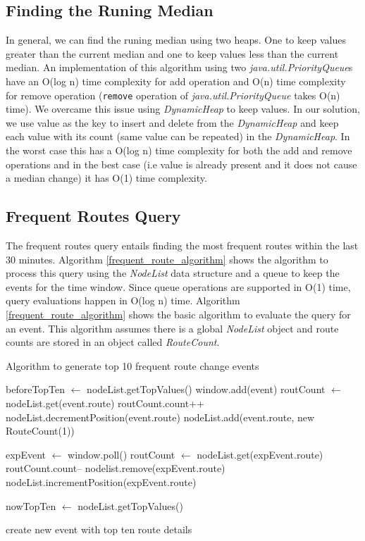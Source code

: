 \subsection{Finding the Runing Median}
In general, we can find the runing median using two heaps. One to keep values greater than the current median and one to keep values less than the current median. An implementation of this algorithm using two \textit{java.util.PriorityQueue}s have an O(log n) time complexity for add operation and O(n) time complexity for remove operation (\texttt{remove} operation of \textit{java.util.PriorityQueue} takes O(n) time).  We overcame this issue using \textit{DynamicHeap} to keep values. In our solution, we use value as the key to insert and delete from the \textit{DynamicHeap} and keep each value with its count (same value can be repeated) in the \textit{DynamicHeap}. In the worst case this has a O(log n) time complexity for both the add and remove operations and in the best case (i.e value is already present and it does not cause a median change) it has O(1) time complexity.

\subsection{Frequent Routes Query}

The frequent routes query entails finding the most frequent routes within the last 30 minutes. Algorithm \ref{frequent_route_algorithm} shows the algorithm to process this query using the \textit{NodeList} data structure and a queue to keep the events for the time window.  Since queue operations are supported in O(1) time, query evaluations happen in O(log n) time. Algorithm \ref{frequent_route_algorithm} shows the basic algorithm to evaluate the query for an event. This algorithm assumes there is a global \textit{NodeList} object and route counts are stored in an object called \textit{RouteCount}. 

\begin{algorithm}
\caption{Algorithm to generate top 10 frequent route change events}
\label{frequent_route_algorithm}
\begin{algorithmic}
\small 
\STATE beforeTopTen $\leftarrow$ nodeList.getTopValues() 
\STATE window.add(event) 
	\STATE routCount $\leftarrow$ nodeList.get(event.route) 
	\STATE routCount.count++ 
	\STATE nodeList.decrementPosition(event.route) 
\ELSE
	\STATE nodeList.add(event.route, new RouteCount(1)) 
\ENDIF

	\STATE  expEvent $\leftarrow$ window.poll() 
	\STATE  routCount $\leftarrow$ nodeList.get(expEvent.route)
	\STATE  routCount.count-- 
		\STATE nodelist.remove(expEvent.route)
	\ELSE
		\STATE nodeList.incrementPosition(expEvent.route) 
	\ENDIF
\ENDWHILE

\STATE nowTopTen $\leftarrow$ nodeList.getTopValues() 

	\STATE create new event with top ten route details 
\ENDIF

\end{algorithmic}
\end{algorithm}

